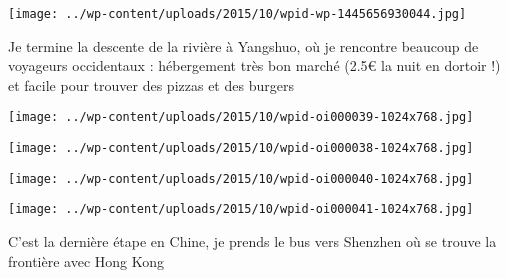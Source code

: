  \newline
 \newline
\centerline{\texttt{[image: ../wp-content/uploads/2015/10/wpid-wp-1445656930044.jpg]} } 
 \newline
 Je termine la descente de la rivière à Yangshuo, où je rencontre beaucoup de voyageurs occidentaux : hébergement très bon marché (2.5€ la nuit en dortoir !) et facile pour trouver des pizzas et des burgers \newline
 \newline
\centerline{\texttt{[image: ../wp-content/uploads/2015/10/wpid-oi000039-1024x768.jpg]} } 
 \newline
 \newline
\centerline{\texttt{[image: ../wp-content/uploads/2015/10/wpid-oi000038-1024x768.jpg]} } 
 \newline
 \newline
\centerline{\texttt{[image: ../wp-content/uploads/2015/10/wpid-oi000040-1024x768.jpg]} } 
 \newline
 \newline
\centerline{\texttt{[image: ../wp-content/uploads/2015/10/wpid-oi000041-1024x768.jpg]} } 
 \newline
 C'est la dernière étape en Chine, je prends le bus vers Shenzhen où se trouve la frontière avec Hong Kong \newline

\newpage
 
